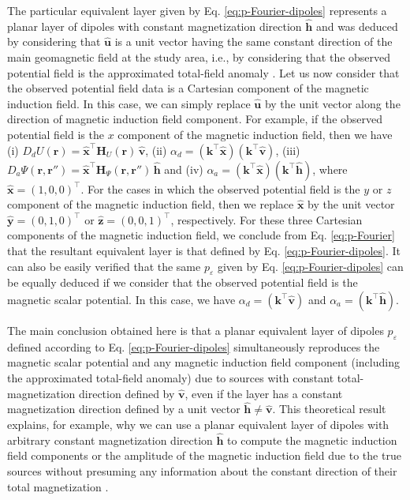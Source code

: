 The particular equivalent layer given by Eq. \ref{eq:p-Fourier-dipoles} represents a 
planar layer of dipoles with constant magnetization direction $\hat{\mathbf{h}}$ and was 
deduced by considering
that $\hat{\mathbf{u}}$ is a unit vector having the same constant direction of the main 
geomagnetic field at the study area, i.e., by considering that the observed potential field is 
the approximated total-field anomaly \citep[e.g.,][p. 179]{blakely1996}.
Let us now consider that the observed potential field data is a Cartesian component of the 
magnetic induction field. In this case, we can simply replace $\hat{\mathbf{u}}$ by the unit 
vector along the direction of 
magnetic induction field component. For example, if the observed potential field is the $x$ 
component of the magnetic induction field, then we have
(i) $D_{d}U(\mathbf{r}) = \hat{\mathbf{x}}^{\top} \mathbf{H}_{U}(\mathbf{r}) \, \hat{\mathbf{v}}$, 
(ii) $\alpha_{d} = \left(\mathbf{k}^{\top} \hat{\mathbf{x}} \right)\left(\mathbf{k}^{\top} \hat{\mathbf{v}} \right)$,
(iii) $D_{a}\Psi(\mathbf{r}, \mathbf{r}'') = \hat{\mathbf{x}}^{\top} \mathbf{H}_{\Psi}(\mathbf{r}, \mathbf{r}'') \, \hat{\mathbf{h}}$ and
(iv) $\alpha_{a} = \left(\mathbf{k}^{\top} \hat{\mathbf{x}} \right)\left(\mathbf{k}^{\top} \hat{\mathbf{h}} \right)$,
where $\hat{\mathbf{x}} = (1, 0, 0)^{\top}$. For the cases in which the observed potential field is the $y$ or 
$z$ component of the magnetic induction field, then we replace $\hat{\mathbf{x}}$ by the 
unit vector $\hat{\mathbf{y}} = (0, 1, 0)^{\top}$ or $\hat{\mathbf{z}} = (0, 0, 1)^{\top}$,
respectively. For these three Cartesian components of the magnetic induction field, we conclude from Eq. 
\ref{eq:p-Fourier} that the resultant equivalent layer is that defined by Eq. \ref{eq:p-Fourier-dipoles}.
It can also be easily verified that the same $p_{\varepsilon}$ given by Eq. 
\ref{eq:p-Fourier-dipoles} can be equally deduced if we consider that the 
observed potential field is the magnetic scalar potential. 
In this case, we have $\alpha_{d} = \left(\mathbf{k}^{\top} \hat{\mathbf{v}} \right)$ and 
$\alpha_{a} = \left(\mathbf{k}^{\top} \hat{\mathbf{h}} \right)$. 

The main conclusion obtained here is that a planar equivalent layer of dipoles $p_{\varepsilon}$ defined according 
to Eq. \ref{eq:p-Fourier-dipoles} simultaneously 
reproduces the magnetic scalar potential and any magnetic induction field component (including the approximated total-field anomaly) 
due to sources with constant total-magnetization direction defined by $\hat{\mathbf{v}}$, even if the layer has a constant magnetization 
direction defined by a unit vector $\hat{\mathbf{h}} \ne \hat{\mathbf{v}}$. 
This theoretical result explains, for example, why we can use a planar equivalent layer of dipoles with arbitrary constant 
magnetization direction $\hat{\mathbf{h}}$ to compute the magnetic induction field components or the amplitude of the 
magnetic induction field due to the true sources without presuming any information about the constant direction of their 
total magnetization \cite[e.g,][]{li_etal_2021}.


